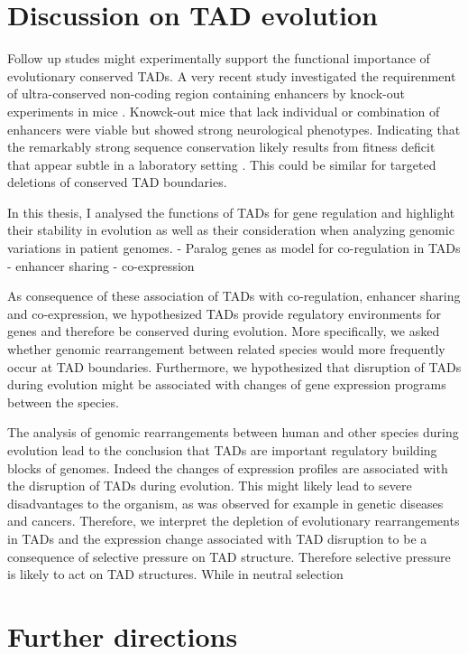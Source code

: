 \documentclass[a4paper,twoside=true,openright,parskip=full,chapterprefix=true,11pt,headings=normal,bibliography=totoc,listof=totoc,titlepage=on,captions=tableabove,draft=false]{scrreprt}
\theoremstyle{definition}
\theoremstyle{definition}
\theoremstyle{definition}
\theoremstyle{remark}
\begin{document}
\section{Discussion on TAD evolution}\label{discussion-on-tad-evolution}

Follow up studes might experimentally support the functional importance
of evolutionary conserved TADs. A very recent study investigated the
requirenment of ultra-conserved non-coding region containing enhancers
by knock-out experiments in mice \citep{Dickel2018}. Knowck-out mice
that lack individual or combination of enhancers were viable but showed
strong neurological phenotypes. Indicating that the remarkably strong
sequence conservation likely results from fitness deficit that appear
subtle in a laboratory setting \citep{Dickel2018}. This could be similar
for targeted deletions of conserved TAD boundaries.

In this thesis, I analysed the functions of TADs for gene regulation and
highlight their stability in evolution as well as their consideration
when analyzing genomic variations in patient genomes. - Paralog genes as
model for co-regulation in TADs - enhancer sharing - co-expression

As consequence of these association of TADs with co-regulation, enhancer
sharing and co-expression, we hypothesized TADs provide regulatory
environments for genes and therefore be conserved during evolution. More
specifically, we asked whether genomic rearrangement between related
species would more frequently occur at TAD boundaries. Furthermore, we
hypothesized that disruption of TADs during evolution might be
associated with changes of gene expression programs between the species.

The analysis of genomic rearrangements between human and other species
during evolution lead to the conclusion that TADs are important
regulatory building blocks of genomes. Indeed the changes of expression
profiles are associated with the disruption of TADs during evolution.
This might likely lead to severe disadvantages to the organism, as was
observed for example in genetic diseases
\citep{Ibn-Salem2014, Lupianez2015} and cancers. Therefore, we interpret
the depletion of evolutionary rearrangements in TADs and the expression
change associated with TAD disruption to be a consequence of selective
pressure on TAD structure. Therefore selective pressure is likely to act
on TAD structures. While in neutral selection

\section{Further directions}\label{further-directions}
\end{document}
